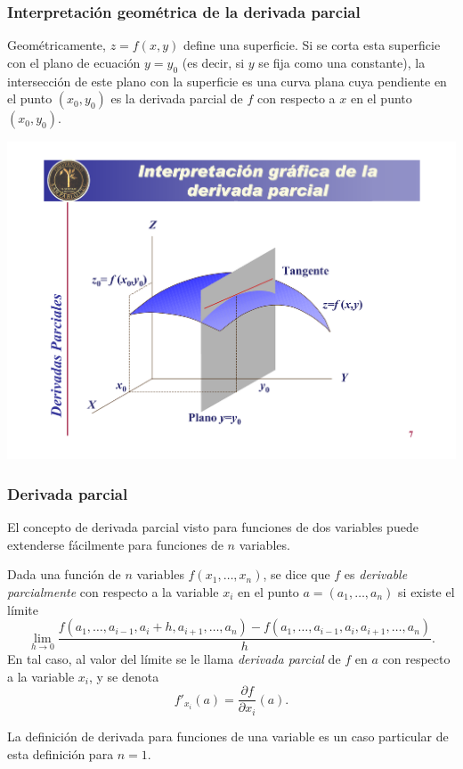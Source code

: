 \begin{frame}
	\frametitle{Interpretación geométrica de la derivada parcial}
	Geométricamente, $z=f(x,y)$ define una superficie. Si se corta esta superficie con el plano de ecuación $y=y_0$ (es
	decir, si $y$ se fija como una constante), la intersección de este plano con la superficie es una curva plana cuya
	pendiente en el punto $(x_0,y_0)$ es la derivada parcial de $f$ con respecto a $x$ en el punto $(x_0,y_0)$.
	
	\begin{center}
		\includegraphics[scale=0.4]{img/tangentesuperficie}
	\end{center}
\end{frame}


\begin{frame}
	\frametitle{Derivada parcial}
	El concepto de derivada parcial visto para funciones de dos variables puede extenderse fácilmente para funciones de $n$
	variables.
	
	\begin{definicion}
		Dada una función de $n$ variables $f(x_1,\ldots,x_n)$, se dice que $f$ es \emph{derivable parcialmente} con respecto a
		la variable $x_i$ en el punto $a=(a_1,\ldots,a_n)$ si existe el límite
		\[
			\lim_{h\rightarrow 0} \frac{f(a_1,\ldots,a_{i-1},a_i+h,a_{i+1},\ldots,a_n)-f(a_1,\ldots,a_{i-1},a_i,a_{i+1},\ldots,a_n)} {h}.
		\]
		En tal caso, al valor del límite se le llama \emph{derivada parcial} de $f$ en $a$ con respecto a la variable $x_i$, y
		se denota
		\[
			f'_{x_i}(a)=\frac{\partial f}{\partial x_i}(a).
		\]
	\end{definicion}
	La definición de derivada para funciones de una variable es un caso particular de esta definición para $n=1$.
\end{frame}


